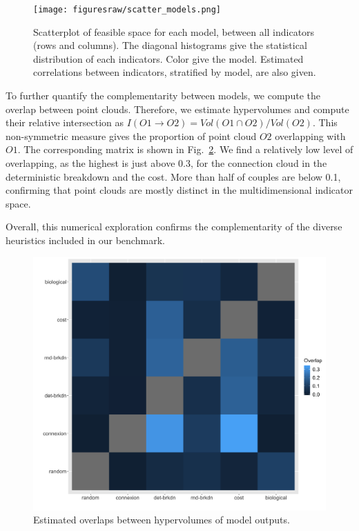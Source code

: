 \documentclass{article}
\begin{document}
\begin{figure}
\centering
\texttt{[image: figuresraw/scatter\_models.png]}
\caption{Scatterplot of feasible space for each model, between all indicators (rows and columns). The diagonal histograms give the statistical distribution of each indicators. Color give the model. Estimated correlations between indicators, stratified by model, are also given.\label{fig:scatter}}
\end{figure}


To further quantify the complementarity between models, we compute the overlap between point clouds. Therefore, we estimate hypervolumes and compute their relative intersection as $I(O1 \rightarrow O2) = Vol(O1 \cap O2) / Vol(O2)$. This non-symmetric measure gives the proportion of point cloud $O2$ overlapping with $O1$. The corresponding matrix is shown in Fig.~\ref{fig:overlap}. We find a relatively low level of overlapping, as the highest is just above 0.3, for the connection cloud in the deterministic breakdown and the cost. More than half of couples are below 0.1, confirming that point clouds are mostly distinct in the multidimensional indicator space.

Overall, this numerical exploration confirms the complementarity of the diverse heuristics included in our benchmark.


\begin{figure}
\centering
\includegraphics[width=\linewidth]{figuresraw/pointclouds-overlap.png}
\caption{Estimated overlaps between hypervolumes of model outputs.\label{fig:overlap}}
\end{figure}
\end{document}
